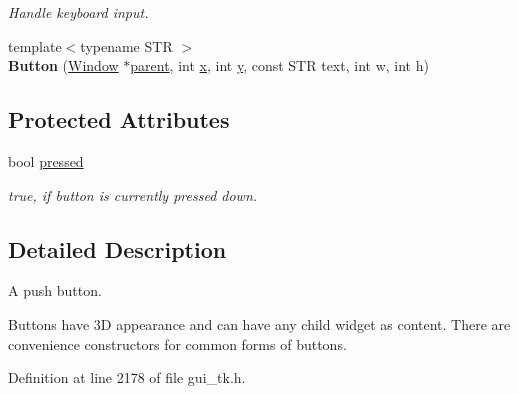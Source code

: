 \begin{DoxyCompactItemize}
\begin{DoxyCompactList}\small\item\em Handle keyboard input. \end{DoxyCompactList}\item 
\hypertarget{classGUI_1_1Button_ada8368b22e9bfcfa7ba9199f9ea3f7cc}{{\footnotesize template$<$typename S\-T\-R $>$ }\\{\bfseries Button} (\hyperlink{classGUI_1_1Window}{Window} $\ast$\hyperlink{classGUI_1_1Window_a2e593ff65e7702178d82fe9010a0b539}{parent}, int \hyperlink{classGUI_1_1Window_a6ca6a80ca00c9e1d8ceea8d3d99a657d}{x}, int \hyperlink{classGUI_1_1Window_a0ee8e923aff2c3661fc2e17656d37adf}{y}, const S\-T\-R text, int w, int h)}\label{classGUI_1_1Button_ada8368b22e9bfcfa7ba9199f9ea3f7cc}

\end{DoxyCompactItemize}
\subsection*{Protected Attributes}
\begin{DoxyCompactItemize}
\item 
\hypertarget{classGUI_1_1Button_aec37fa9a4a6ea6d1e0e2788d42d67ee1}{bool \hyperlink{classGUI_1_1Button_aec37fa9a4a6ea6d1e0e2788d42d67ee1}{pressed}}\label{classGUI_1_1Button_aec37fa9a4a6ea6d1e0e2788d42d67ee1}

\begin{DoxyCompactList}\small\item\em {\ttfamily true}, if button is currently pressed down. \end{DoxyCompactList}\end{DoxyCompactItemize}


\subsection{Detailed Description}
A push button. 

Buttons have 3\-D appearance and can have any child widget as content. There are convenience constructors for common forms of buttons. 

Definition at line 2178 of file gui\-\_\-tk.\-h.




